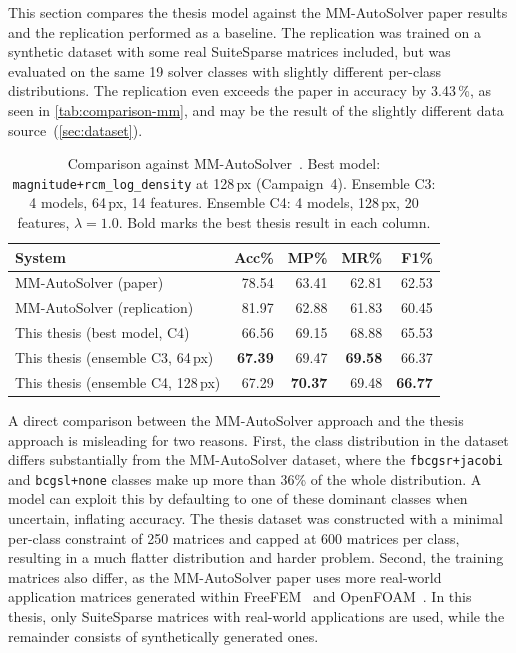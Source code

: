 This section compares the thesis model against the MM-AutoSolver paper results and the replication performed as a baseline.
The replication was trained on a synthetic dataset with some real SuiteSparse matrices included, but was
evaluated on the same 19 solver classes with slightly different per-class distributions.
The replication even exceeds the paper in accuracy by 3.43\,\%, as seen in \autoref{tab:comparison-mm}, and
may be the result of the slightly different data source~(\autoref{sec:dataset}).
\begin{table}[H]
  \centering
  \caption{Comparison against MM-AutoSolver~\cite{xiong2025mmautosolver}.
           Best model: \texttt{magnitude+\allowbreak rcm\_log\_density} at 128\,px (Campaign~4).
           Ensemble C3: 4 models, 64\,px, 14 features.
           Ensemble C4: 4 models, 128\,px, 20 features, $\lambda=1.0$.
           Bold marks the best thesis result in each column.}
  \label{tab:comparison-mm}
  \begin{tabular}{lrrrr}
    \toprule
    \textbf{System} & \textbf{Acc\%} & \textbf{MP\%} & \textbf{MR\%} & \textbf{F1\%} \\
    \midrule
    MM-AutoSolver (paper)              & 78.54 & 63.41 & 62.81 & 62.53 \\
    MM-AutoSolver (replication)        & 81.97 & 62.88 & 61.83 & 60.45 \\
    \midrule
    This thesis (best model, C4)      & 66.56 & 69.15 & 68.88 & 65.53 \\
    This thesis (ensemble C3, 64\,px)  & \textbf{67.39} & 69.47 & \textbf{69.58} & 66.37 \\
    This thesis (ensemble C4, 128\,px) & 67.29 & \textbf{70.37} & 69.48 & \textbf{66.77} \\
    \bottomrule
  \end{tabular}
\end{table}

A direct comparison between the MM-AutoSolver approach and the thesis approach is misleading for two reasons.
First, the class distribution in the dataset differs substantially from the MM-AutoSolver dataset, where the \texttt{fbcgsr+jacobi} and \texttt{bcgsl+none} classes make up more than 36\% of the whole distribution.
A model can exploit this by defaulting to one of these dominant classes when uncertain, inflating accuracy.
The thesis dataset was constructed with a minimal per-class constraint of 250 matrices and capped at 600 matrices per class,
resulting in a much flatter distribution and harder problem.
Second, the training matrices also differ, as the MM-AutoSolver paper uses more real-world application matrices generated
within FreeFEM~\cite{hecht2012freefem} and OpenFOAM~\cite{weller1998tensorial}.
In this thesis, only SuiteSparse matrices with real-world applications are used, while the remainder consists of synthetically generated ones.

